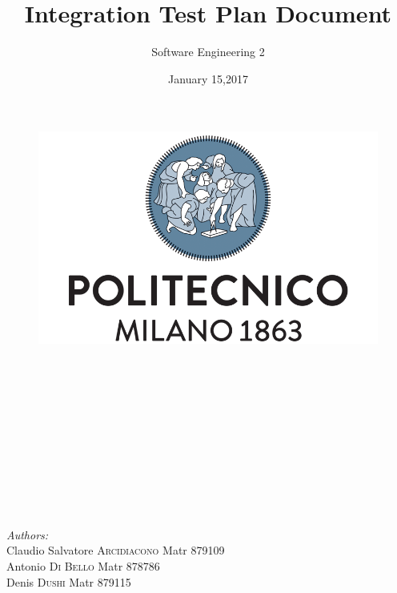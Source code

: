 \documentclass[a4paper]{article}
\title{Integration Test Plan Document}
\author{Software Engineering 2}
\date{January 15,2017}
\begin{document}
\maketitle

\begin{figure}[h]
  \centering
  \includegraphics[width=300 pt]{resources/polimi.png}
  \label{fig:polimi}
\end{figure}

\emph{\\}
\emph{\\}
\emph{\\}
\emph{\\}
\emph{\\}
\emph{\\}
\emph{\\}
\emph{\\}
\emph{\\}
\emph{\\}

\begin{minipage}{0.7\textwidth}
\begin{flushleft} \large
\emph{Authors:}\\
Claudio Salvatore \textsc{Arcidiacono} Matr 879109\\
Antonio \emph{ }\emph{ }\emph{ }\emph{ }\emph{ }\emph{ }\emph{ }\emph{ }\emph{ }\emph{ }\emph{ }\emph{ }\textsc{Di Bello} \emph{ }\emph{ }\emph{ }\emph{ } Matr 878786\\
Denis  \emph{ }\emph{ }\emph{ }\emph{ }\emph{ }\emph{ }\emph{ }\emph{ }\emph{ }\emph{ }\emph{ }\emph{ }\emph{ }\emph{ }\emph{ }\textsc{Dushi } \emph{ }\emph{ }\emph{ }\emph{ }\emph{ }\emph{ }\emph{ }\emph{ }\emph{ }Matr 879115
\end{flushleft}
\end{minipage}

\begin{minipage}{0.4\textwidth}

\end{minipage}
\end{document}
